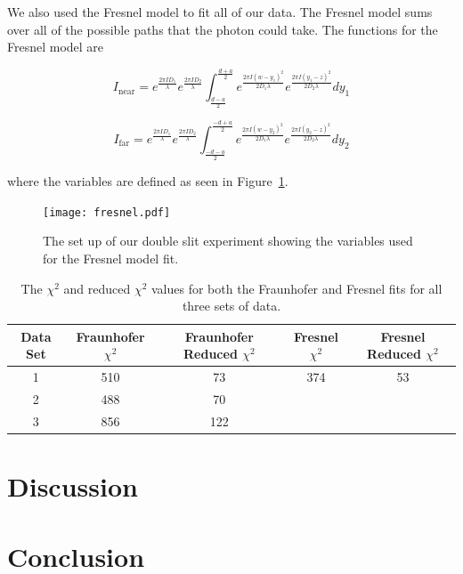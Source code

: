 \documentclass[prb,preprint]{revtex4-1}
\begin{document}
We also used the Fresnel model to fit all of our data. The Fresnel model sums over all of the possible paths that the photon could take. The functions for the Fresnel model are

\begin{equation}
\label{fresnelnear}
I_\text{near} = e^{\frac{2 \pi I D_1}{\lambda}} e^{\frac{2 \pi I D_2}{\lambda}} \int_\frac{d-a}{2}^\frac{d+a}{2} e^{\frac{2 \pi I (w-y_1)^2}{2 D_1 \lambda}} e^{\frac{2 \pi I (y_1-z)^2}{2 D_2 \lambda}} dy_1
\end{equation}

\begin{equation}
\label{fresnelfar}
I_\text{far} = e^{\frac{2 \pi I D_1}{\lambda}} e^{\frac{2 \pi I D_2}{\lambda}} \int_\frac{-d-a}{2}^\frac{-d+a}{2} e^{\frac{2 \pi I (w-y_2)^2}{2 D_1 \lambda}} e^{\frac{2 \pi I (y_2-z)^2}{2 D_2 \lambda}} dy_2
\end{equation}

where the variables are defined as seen in Figure~\ref{fresnel}.

\begin{figure}[h!]
\centering
\texttt{[image: fresnel.pdf]}
\caption{The set up of our double slit experiment showing the variables used for the Fresnel model fit.}
\label{fresnel}
\end{figure}


\begin{table}[h!]
\centering
\caption{The $\chi^2$ and reduced $\chi^2$ values for both the Fraunhofer and Fresnel fits for all three sets of data.}
\begin{ruledtabular}
\begin{tabular}{c c c c c}
Data Set & Fraunhofer $\chi^2$ & Fraunhofer Reduced $\chi^2$ & Fresnel $\chi^2$ & Fresnel Reduced $\chi^2$ \\
\hline	
1 & 510 &   73 & 374 & 53  \\
2 & 488 &   70 &  &   \\
3 & 856 & 122 &  &   \\

\end{tabular}
\end{ruledtabular}
\label{chisquared}
\end{table}


\section{Discussion}


\section{Conclusion}
\end{document}
